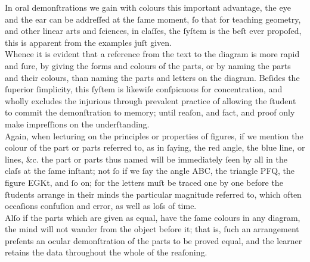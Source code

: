 \newpage

\begin{minipage}{0.80\textwidth}
    In oral demonſtrations we gain with colours this important advantage, the eye and the ear can be addreſſed at the ſame moment, ſo that for teaching geometry, and other linear arts and ſciences, in claſſes, the ſyſtem is the beſt ever propoſed, this is apparent from the examples juſt given.\\

    Whence it is evident that a reference from the text to the diagram is more rapid and ſure, by giving the forms and colours of the parts, or by naming the parts and their colours, than naming the parts and letters on the diagram. Beſides the ſuperior ſimplicity, this ſyſtem is likewiſe conſpicuous for concentration, and wholly excludes the injurious through prevalent practice of allowing the ſtudent to commit the demonſtration to memory; until reaſon, and fact, and proof only make impreſſions on the underſtanding.\\

    Again, when lecturing on the principles or properties of figures, if we mention the colour of the part or parts referred to, as in ſaying, the red angle, the blue line, or lines, \&c. the part or parts thus named will be immediately ſeen by all in the claſs at the ſame inſtant; not ſo if we ſay the angle ABC, the triangle PFQ, the figure EGKt, and ſo on; for the letters muſt be traced one by one before the ſtudents arrange in their minds the particular magnitude referred to, which often occaſions confuſion and error, as well as loſs of time.\\

    Alſo if the parts which are given as equal, have the ſame colours in any diagram, the mind will not wander from the object before it; that is, ſuch an arrangement preſents an ocular demonſtration of the parts to be proved equal, and the learner retains the data throughout the whole of the reaſoning.
\end{minipage}

\newpage

